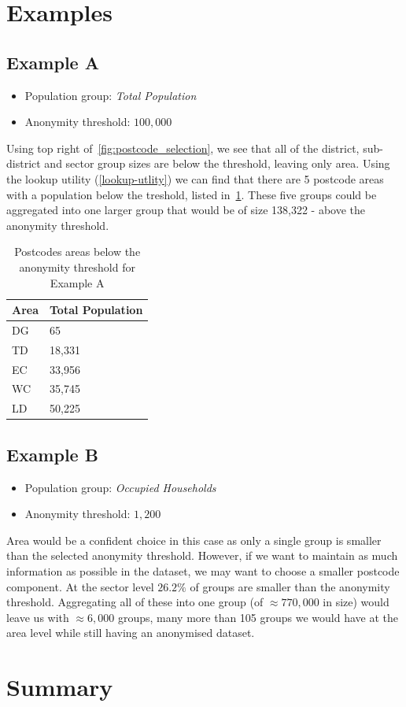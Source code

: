 \documentclass[12pt, a4paper]{article}
\begin{document}
\section{Examples}
\subsection{Example A}
\begin{itemize}
\item Population group: \textit{Total Population}
\item Anonymity threshold: $100,000$
\end{itemize}
Using top right of~\cref{fig:postcode_selection}, we see that all of the district, sub-district and sector group sizes are below the threshold, leaving only area. Using the lookup utility (\cref{lookup-utlity}) we can find that there are 5 postcode areas with a population below the treshold, listed in~\cref{table:example_a}. These five groups could be aggregated into one larger group that would be of size 138,322 - above the anonymity threshold.

\begin{table}
\begin{center}
\begin{tabular}{ll}
    \toprule
    Area &  Total Population \\
    \midrule
    DG   &                65 \\
    TD   &             18,331 \\
    EC   &             33,956 \\
    WC   &             35,745 \\
    LD   &             50,225 \\
    \bottomrule
\end{tabular}
\caption{Postcodes areas below the anonymity threshold for Example A}\label{table:example_a}
\end{center}
\end{table}

\subsection{Example B}

\begin{itemize}
    \item Population group: \textit{Occupied Households}
    \item Anonymity threshold: $1,200$
\end{itemize}

Area would be a confident choice in this case as only a single group is smaller than the selected anonymity threshold. However, if we want to maintain as much information as possible in the dataset, we may want to choose a smaller postcode component. At the sector level $26.2\%$ of groups are smaller than the anonymity threshold. Aggregating all of these into one group (of $\approx770,000$ in size) would leave us with $\approx6,000$ groups, many more than 105 groups we would have at the area level while still having an anonymised dataset.

\section{Summary}
\end{document}
